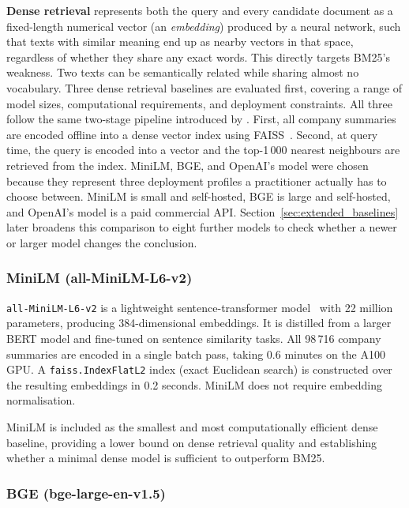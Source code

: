 \documentclass[a4paper,oneside,bibliography=totoc]{scrbook}
\begin{document}
\label{sec:baseline_dense}

\textbf{Dense retrieval} represents both the query and every candidate document as a fixed-length numerical vector (an \emph{embedding}) produced by a neural network, such that texts with similar meaning end up as nearby vectors in that space, regardless of whether they share any exact words. This directly targets BM25's weakness. Two texts can be semantically related while sharing almost no vocabulary. Three dense retrieval baselines are evaluated first, covering a range of model sizes, computational requirements, and deployment constraints. All three follow the same two-stage pipeline introduced by \citet{karpukhin2020dense}. First, all company summaries are encoded offline into a dense vector index using FAISS~\citep{johnson2017billion}. Second, at query time, the query is encoded into a vector and the top-1\,000 nearest neighbours are retrieved from the index. MiniLM, BGE, and OpenAI's model were chosen because they represent three deployment profiles a practitioner actually has to choose between. MiniLM is small and self-hosted, BGE is large and self-hosted, and OpenAI's model is a paid commercial API. Section~\ref{sec:extended_baselines} later broadens this comparison to eight further models to check whether a newer or larger model changes the conclusion.

\subsubsection{MiniLM (all-MiniLM-L6-v2)}
\label{subsec:minilm}

\texttt{all-MiniLM-L6-v2} is a lightweight sentence-transformer model~\citep{reimers2019sentence} with 22 million parameters, producing 384-dimensional embeddings. It is distilled from a larger BERT model and fine-tuned on sentence similarity tasks. All 98\,716 company summaries are encoded in a single batch pass, taking 0.6 minutes on the A100 GPU. A \texttt{faiss.IndexFlatL2} index (exact Euclidean search) is constructed over the resulting embeddings in 0.2 seconds. MiniLM does not require embedding normalisation.

MiniLM is included as the smallest and most computationally efficient dense baseline, providing a lower bound on dense retrieval quality and establishing whether a minimal dense model is sufficient to outperform BM25.

\subsubsection{BGE (bge-large-en-v1.5)}
\label{subsec:bge}
\end{document}
